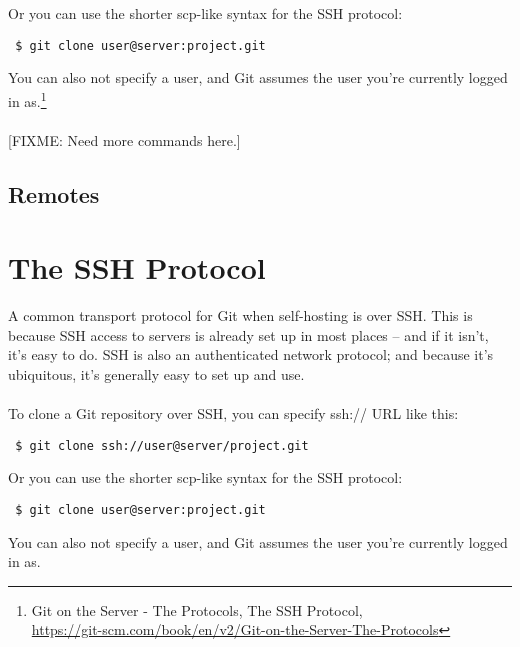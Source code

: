\documentclass[12pt,letterpaper,dvips]{article}
\newcommand{\FIXME}[1]{\textsf{[FIXME: #1]}}
\begin{document}
\noindent Or you can use the shorter scp-like syntax for the SSH protocol:

\begin{Verbatim}
 $ git clone user@server:project.git
\end{Verbatim}

\noindent You can also not specify a user, and Git assumes the user
you're currently logged in as.\footnote{
Git on the Server - The Protocols, The SSH Protocol,\\
\href{https://git-scm.com/book/en/v2/Git-on-the-Server-The-Protocols}{https://git-scm.com/book/en/v2/Git-on-the-Server-The-Protocols}}
\\
\\
\noindent \FIXME{Need more commands here.}


\subsection{Remotes}



\newpage
\section{The SSH Protocol}
A common transport protocol for Git when self-hosting is over SSH.
This is because SSH access to servers is already set up in most
places – and if it isn’t, it's easy to do.  SSH is also an
authenticated network protocol; and because it’s ubiquitous,
it's generally easy to set up and use.
\\
\\
To clone a Git repository over SSH, you can specify ssh:// URL like this:

\begin{Verbatim}
 $ git clone ssh://user@server/project.git
\end{Verbatim}

\noindent Or you can use the shorter scp-like syntax for the SSH
protocol:

\begin{Verbatim}
 $ git clone user@server:project.git
\end{Verbatim}

\noindent You can also not specify a user, and Git assumes the
user you’re currently logged in as.
\end{document}
